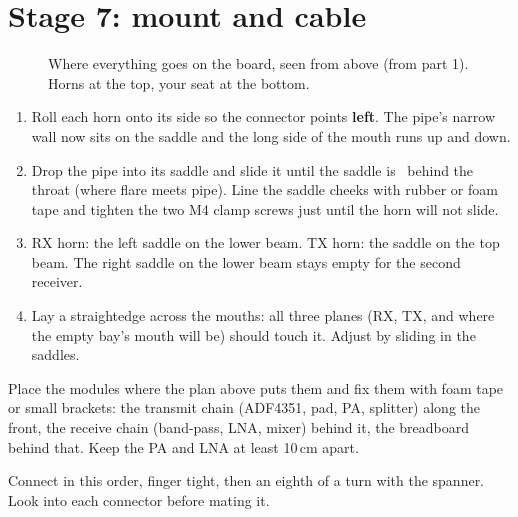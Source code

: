 \documentclass[10pt]{article}
\begin{document}
\section{Stage 7: mount and cable}\label{sec:mount}

\begin{figure}[H]
\centering
\scalebox{0.92}{}
\caption{Where everything goes on the board, seen from above (from part 1). Horns at the top, your seat at the bottom.}
\end{figure}

\begin{enumerate}
  \item Roll each horn onto its side so the connector points \textbf{left}. The pipe's narrow wall now sits on the saddle and the long side of the mouth runs up and down.
  \item Drop the pipe into its saddle and slide it until the saddle is \saddleBehind\ behind the throat (where flare meets pipe). Line the saddle cheeks with rubber or foam tape and tighten the two M4 clamp screws just until the horn will not slide.
  \item RX horn: the left saddle on the lower beam. TX horn: the saddle on the top beam. The right saddle on the lower beam stays empty for the second receiver.
  \item Lay a straightedge across the mouths: all three planes (RX, TX, and where the empty bay's mouth will be) should touch it. Adjust by sliding in the saddles.
\end{enumerate}

Place the modules where the plan above puts them and fix them with foam tape or small brackets: the transmit chain (ADF4351, pad, PA, splitter) along the front, the receive chain (band-pass, LNA, mixer) behind it, the breadboard behind that. Keep the PA and LNA at least 10\,cm apart.

Connect in this order, finger tight, then an eighth of a turn with the spanner. Look into each connector before mating it.
\end{document}
